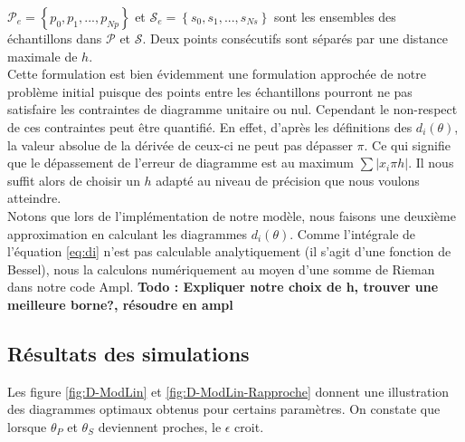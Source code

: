 $\mathcal{P}_e = \left\lbrace p_0,p_1,...,p_{Np}\right\rbrace$ et $\mathcal{S}_e= \left\lbrace s_0,s_1,...,s_{Ns}\right\rbrace$ sont les ensembles des échantillons dans $\mathcal{P}$ et $\mathcal{S}$. Deux points consécutifs sont séparés par une distance maximale de $h$.\\
Cette formulation est bien évidemment une formulation approchée de notre problème initial puisque des points entre les échantillons pourront ne pas satisfaire les contraintes de diagramme unitaire ou nul. Cependant le non-respect de ces contraintes peut être quantifié. En effet, d'après les définitions des $d_i(\theta)$, la valeur absolue de la dérivée de ceux-ci ne peut pas dépasser $\pi$. Ce qui signifie que le dépassement de l'erreur de diagramme est au maximum $\sum |x_i\pi h|$. Il nous suffit alors de choisir un $h$ adapté au niveau de précision que nous voulons atteindre. 
\\
Notons que lors de l'implémentation de notre modèle, nous faisons une deuxième approximation en calculant les diagrammes $d_i(\theta)$. Comme l'intégrale de l'équation \eqref{eq:di} n'est pas calculable analytiquement (il s'agit d'une fonction de Bessel), nous la calculons numériquement au moyen d'une somme de Rieman dans notre code Ampl.
\textbf{Todo : Expliquer notre choix de h, trouver une meilleure borne?, résoudre en ampl}		\\

\subsection{Résultats des simulations}
Les figure \ref{fig:D-ModLin} et \ref{fig:D-ModLin-Rapproche} donnent une illustration des diagrammes optimaux obtenus pour certains paramètres. On constate que lorsque $\theta_P$ et $\theta_S$ deviennent proches, le $\epsilon$ croit.


